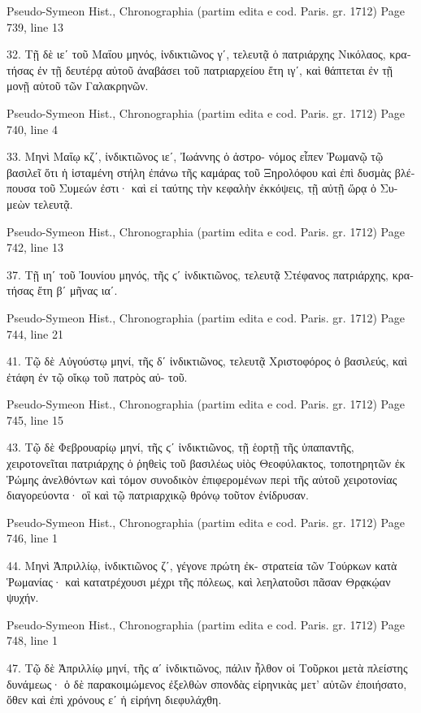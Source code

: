 \documentclass[12pt,letterpaper,twoside,final]{memoir}
\begin{document}
\begin{greek}
Pseudo-Symeon Hist., Chronographia (partim edita e cod. Paris. gr. 1712) 
Page 739, line 13

32. Τῇ δὲ ιεʹ τοῦ Μαΐου μηνός, ἰνδικτιῶνος γʹ, τελευτᾷ 
ὁ πατριάρχης Νικόλαος, κρατήσας ἐν τῇ δευτέρᾳ αὐτοῦ ἀναβάσει 
τοῦ πατριαρχείου ἔτη ιγʹ, καὶ θάπτεται ἐν τῇ μονῇ αὐτοῦ τῶν 
Γαλακρηνῶν. 



Pseudo-Symeon Hist., Chronographia (partim edita e cod. Paris. gr. 1712) 
Page 740, line 4

33. Μηνὶ Μαΐῳ κζʹ, ἰνδικτιῶνος ιεʹ, Ἰωάννης ὁ ἀστρο-
νόμος εἶπεν Ῥωμανῷ τῷ βασιλεῖ ὅτι ἡ ἱσταμένη στήλη ἐπάνω τῆς 
καμάρας τοῦ Ξηρολόφου καὶ ἐπὶ δυσμὰς βλέπουσα τοῦ Συμεών 
ἐστι· καὶ εἰ ταύτης τὴν κεφαλὴν ἐκκόψεις, τῇ αὐτῇ ὥρᾳ ὁ Συ-
μεὼν τελευτᾷ. 



Pseudo-Symeon Hist., Chronographia (partim edita e cod. Paris. gr. 1712) 
Page 742, line 13

37. Τῇ ιηʹ τοῦ Ἰουνίου μηνός, τῆς ϛʹ ἰνδικτιῶνος, τελευτᾷ 
Στέφανος πατριάρχης, κρατήσας ἔτη βʹ μῆνας ιαʹ. 



Pseudo-Symeon Hist., Chronographia (partim edita e cod. Paris. gr. 1712) 
Page 744, line 21

41. Τῷ δὲ Αὐγούστῳ μηνί, τῆς δʹ ἰνδικτιῶνος, τελευτᾷ 
Χριστοφόρος ὁ βασιλεύς, καὶ ἐτάφη ἐν τῷ οἴκῳ τοῦ πατρὸς αὐ-
τοῦ. 



Pseudo-Symeon Hist., Chronographia (partim edita e cod. Paris. gr. 1712) 
Page 745, line 15

43. Τῷ δὲ Φεβρουαρίῳ μηνί, τῆς ϛʹ ἰνδικτιῶνος, τῇ 
ἑορτῇ τῆς ὑπαπαντῆς, χειροτονεῖται πατριάρχης ὁ ῥηθεὶς τοῦ 
βασιλέως υἱὸς Θεοφύλακτος, τοποτηρητῶν ἐκ Ῥώμης ἀνελθόντων 
καὶ τόμον συνοδικὸν ἐπιφερομένων περὶ τῆς αὐτοῦ χειροτονίας 
διαγορεύοντα· οἳ καὶ τῷ πατριαρχικῷ θρόνῳ τοῦτον ἐνίδρυσαν. 



Pseudo-Symeon Hist., Chronographia (partim edita e cod. Paris. gr. 1712) 
Page 746, line 1

44. Μηνὶ Ἀπριλλίῳ, ἰνδικτιῶνος ζʹ, γέγονε πρώτη ἐκ-
στρατεία τῶν Τούρκων κατὰ Ῥωμανίας· καὶ κατατρέχουσι μέχρι 
τῆς πόλεως, καὶ λεηλατοῦσι πᾶσαν Θρᾳκῴαν ψυχήν. 



Pseudo-Symeon Hist., Chronographia (partim edita e cod. Paris. gr. 1712) 
Page 748, line 1

47. Τῷ δὲ Ἀπριλλίῳ μηνί, τῆς αʹ ἰνδικτιῶνος, πάλιν 
ἦλθον οἱ Τοῦρκοι μετὰ πλείστης δυνάμεως· ὁ δὲ παρακοιμώμενος 
ἐξελθὼν σπονδὰς εἰρηνικὰς μετ' αὐτῶν ἐποιήσατο, ὅθεν καὶ ἐπὶ 
χρόνους εʹ ἡ εἰρήνη διεφυλάχθη. 




\end{greek}
\end{document}
